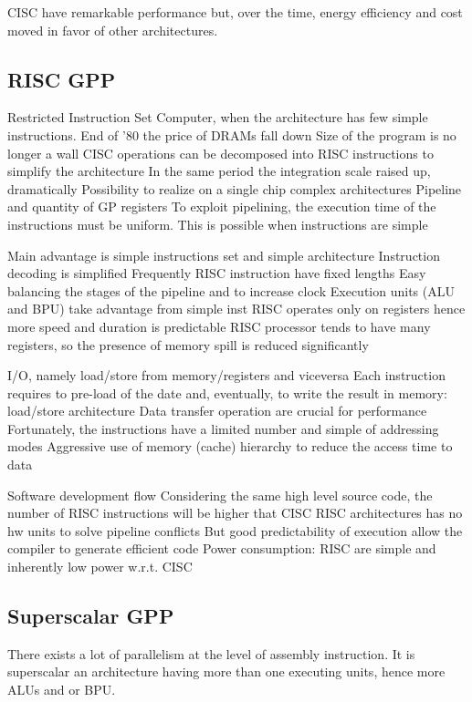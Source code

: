 CISC have remarkable performance but, over the time, energy efficiency and cost moved in favor of other architectures.

\subsection{RISC GPP}
Restricted Instruction Set Computer, when the
architecture has few simple instructions.
End of '80 the price of DRAMs fall down
Size of the program is no longer a wall
CISC operations can be decomposed into RISC instructions to simplify the architecture
In the same period the integration scale raised up, dramatically
Possibility to realize on a single chip complex architectures
Pipeline and quantity of GP registers
To exploit pipelining, the execution time of the instructions must be uniform. 
This is possible when instructions are simple

Main advantage is simple instructions set and simple architecture
Instruction decoding is simplified
Frequently RISC instruction have fixed lengths
Easy balancing the stages of the pipeline and to increase clock
Execution units (ALU and BPU) take advantage from simple inst
RISC operates only on registers hence more speed and duration is predictable
RISC processor tends to have many registers, so the presence of memory spill is reduced significantly

I/O, namely load/store from memory/registers and viceversa
Each instruction requires to pre-load of the date and, eventually, to write the result in memory: load/store architecture
Data transfer operation are crucial for performance
Fortunately, the instructions have a limited number and simple of addressing modes
Aggressive use of memory (cache) hierarchy to reduce the access time to data

Software development flow
Considering the same high level source code, the number of RISC instructions will be higher that CISC
RISC architectures has no hw units to solve pipeline conflicts
But good predictability of execution allow the compiler to generate efficient code
Power consumption: RISC are simple and inherently low power w.r.t. CISC

\subsection{Superscalar GPP}
There exists a lot of parallelism at the level of assembly instruction.
It is superscalar an architecture having more than one executing units, hence more ALUs and or BPU.


